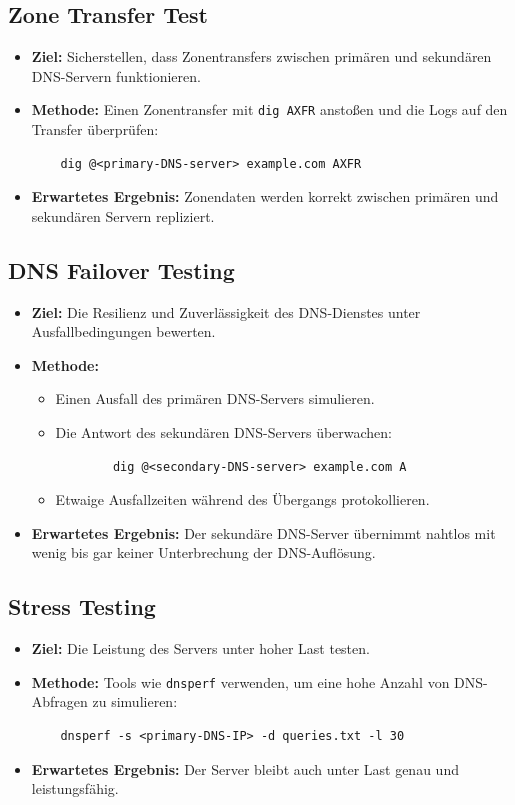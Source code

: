 \documentclass[a4paper,12pt]{article}
\begin{document}
\subsection*{Zone Transfer Test}
\begin{itemize}[leftmargin=1.5cm]
	\item \textbf{Ziel:} Sicherstellen, dass Zonentransfers zwischen primären und sekundären DNS-Servern funktionieren.
	\item \textbf{Methode:} Einen Zonentransfer mit \texttt{dig AXFR} anstoßen und die Logs auf den Transfer überprüfen:
	      \begin{verbatim}
    dig @<primary-DNS-server> example.com AXFR
    \end{verbatim}
	\item \textbf{Erwartetes Ergebnis:} Zonendaten werden korrekt zwischen primären und sekundären Servern repliziert.
\end{itemize}

\subsection*{DNS Failover Testing}
\begin{itemize}[leftmargin=1.5cm]
	\item \textbf{Ziel:} Die Resilienz und Zuverlässigkeit des DNS-Dienstes unter Ausfallbedingungen bewerten.
	\item \textbf{Methode:}
	      \begin{itemize}
		      \item Einen Ausfall des primären DNS-Servers simulieren.
		      \item Die Antwort des sekundären DNS-Servers überwachen:
		            \begin{verbatim}
        dig @<secondary-DNS-server> example.com A
        \end{verbatim}
		      \item Etwaige Ausfallzeiten während des Übergangs protokollieren.
	      \end{itemize}
	\item \textbf{Erwartetes Ergebnis:} Der sekundäre DNS-Server übernimmt nahtlos mit wenig bis gar keiner Unterbrechung der DNS-Auflösung.
\end{itemize}

\subsection*{Stress Testing}
\begin{itemize}[leftmargin=1.5cm]
	\item \textbf{Ziel:} Die Leistung des Servers unter hoher Last testen.
	\item \textbf{Methode:} Tools wie \texttt{dnsperf} verwenden, um eine hohe Anzahl von DNS-Abfragen zu simulieren:
	      \begin{verbatim}
    dnsperf -s <primary-DNS-IP> -d queries.txt -l 30
    \end{verbatim}
	\item \textbf{Erwartetes Ergebnis:} Der Server bleibt auch unter Last genau und leistungsfähig.
\end{itemize}
\end{document}
